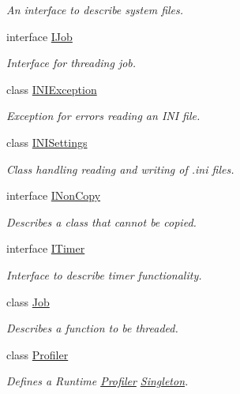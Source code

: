 \begin{DoxyCompactItemize}
\begin{DoxyCompactList}\small\item\em An interface to describe system files. \end{DoxyCompactList}\item 
interface \hyperlink{classHatchit_1_1Core_1_1IJob}{I\+Job}
\begin{DoxyCompactList}\small\item\em Interface for threading job. \end{DoxyCompactList}\item 
class \hyperlink{classHatchit_1_1Core_1_1INIException}{I\+N\+I\+Exception}
\begin{DoxyCompactList}\small\item\em Exception for errors reading an I\+NI file. \end{DoxyCompactList}\item 
class \hyperlink{classHatchit_1_1Core_1_1INISettings}{I\+N\+I\+Settings}
\begin{DoxyCompactList}\small\item\em Class handling reading and writing of .ini files. \end{DoxyCompactList}\item 
interface \hyperlink{classHatchit_1_1Core_1_1INonCopy}{I\+Non\+Copy}
\begin{DoxyCompactList}\small\item\em Describes a class that cannot be copied. \end{DoxyCompactList}\item 
interface \hyperlink{classHatchit_1_1Core_1_1ITimer}{I\+Timer}
\begin{DoxyCompactList}\small\item\em Interface to describe timer functionality. \end{DoxyCompactList}\item 
class \hyperlink{classHatchit_1_1Core_1_1Job}{Job}
\begin{DoxyCompactList}\small\item\em Describes a function to be threaded. \end{DoxyCompactList}\item 
class \hyperlink{classHatchit_1_1Core_1_1Profiler}{Profiler}
\begin{DoxyCompactList}\small\item\em Defines a Runtime \hyperlink{classHatchit_1_1Core_1_1Profiler}{Profiler} \hyperlink{classHatchit_1_1Core_1_1Singleton}{Singleton}. \end{DoxyCompactList}\item 

\end{DoxyCompactItemize}
